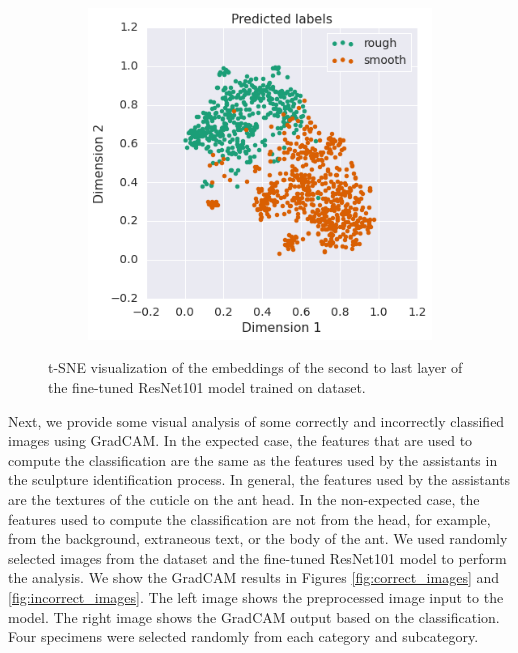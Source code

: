 \documentclass{aci}
\numberwithin{equation}{section}
\begin{document}
\begin{figure}[h]
\begin{subfigure}{.45\textwidth}
        \includegraphics[width=1\linewidth]{thesis_assets/plots/fresnet101_pred_tsne.png}
    \end{subfigure}
    \caption{t-SNE visualization of the embeddings of the second to last layer
        of the fine-tuned ResNet101 model trained on dataset.}
    \label{fig:fresnet101_tsne}
\end{figure}



Next, we provide some visual analysis of some correctly and incorrectly
classified images using GradCAM. In the expected case, the features that are
used to compute the classification are the same as the features used by the
assistants in the sculpture identification process. In general, the features
used by the assistants are the textures of the cuticle on the ant head. In the
non-expected case, the features used to compute the classification are not from
the head, for example, from the background, extraneous text, or the body of the
ant. We used randomly selected images from the dataset and the fine-tuned
ResNet101 model to perform the analysis. We show the GradCAM results in Figures
\ref{fig:correct_images} and \ref{fig:incorrect_images}. The left image shows
the preprocessed image input to the model. The right image shows the GradCAM
output based on the classification. Four specimens were selected randomly from
each category and subcategory.
\end{document}

